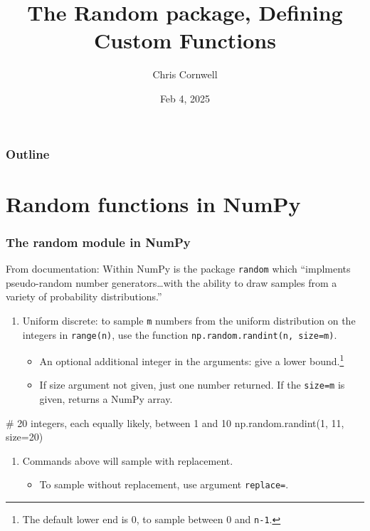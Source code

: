 \documentclass{beamer}
\author{Chris Cornwell}
\date{Feb 4, 2025}
\title{The Random package, Defining Custom Functions}
\newenvironment{codeblock}
    {\hfill\begin{beamerboxesrounded}[lower=codecol, width=0.8\textwidth]
    \medskip

    }
    { 
    \end{beamerboxesrounded}\hfill
    }
\theoremstyle{example}
\newcommand{\ttt}[1]{{\small\texttt{#1}}}
\begin{document}
\begin{frame}
\titlepage
\end{frame}

\begin{frame}
\frametitle{Outline}
\tableofcontents
\end{frame}

\section{Random functions in NumPy}

\begin{frame}[fragile]
\frametitle{The {\ttm random} module in NumPy}
From documentation: Within NumPy is the package \ttt{random} which ``implments pseudo-random number generators\ldots with the ability to draw samples from a variety of probability distributions.''
\begin{enumerate}
    \item Uniform discrete: to sample \ttt{m} numbers from the uniform distribution on the integers in \ttt{range(n)}, use the function \ttt{np.random.randint(n, size=m)}. 
    \begin{itemize}
        \item An optional additional integer in the arguments: give a lower bound.\footnote{The default lower end is 0, to sample between 0 and \ttt{n-1}.}
        \item If size argument not given, just one number returned. If the \ttt{size=m} is given, returns a NumPy array.
    \end{itemize}
\end{enumerate}

\begin{codeblock}

\begin{python}
    # 20 integers, each equally likely, between 1 and 10
    np.random.randint(1, 11, size=20)
\end{python}

\end{codeblock}

\begin{enumerate}
    \item[] Commands above will sample with replacement.
    \begin{itemize}
        \item To sample without replacement, use argument \ttt{replace=}{\color{numeric}\ttt{False}}.
    \end{itemize}
\end{enumerate}

\end{frame}
\end{document}
